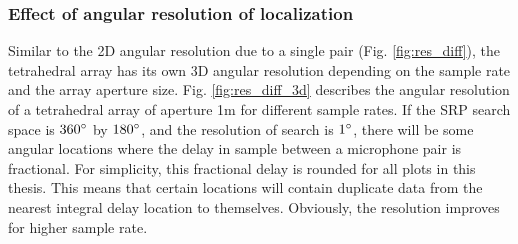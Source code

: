 \subsubsection{Effect of angular resolution of localization}
Similar to the 2D angular resolution due to a single pair (Fig. \ref{fig:res_diff}), the tetrahedral array has its own 3D  angular resolution depending on the sample rate and the array aperture size. Fig. \ref{fig:res_diff_3d} describes the angular resolution of a tetrahedral array of aperture 1m for different sample rates. If the SRP search space is $360\degree$ by $180\degree$, and the resolution of search is $1\degree$, there will be some angular locations where the delay in sample between a microphone pair is fractional. For simplicity, this fractional delay is rounded for all plots in this thesis. This means that certain locations will contain duplicate data from the nearest integral delay location to themselves. Obviously, the resolution improves for higher sample rate.
